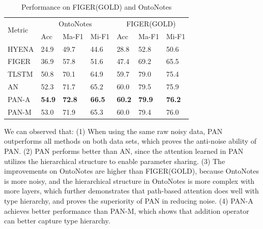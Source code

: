 \documentclass[letterpaper]{article} %
\begin{document}
\vspace{-17pt}
\begin{table}[htbp]
\small
\centering
\caption{Performance on FIGER(GOLD) and OntoNotes}
\label{performance}
 \begin{tabular}{p{1cm}|p{0.61cm}p{0.87cm}p{0.87cm}|p{0.60cm}p{0.87cm}p{0.87cm}}
\hline
\multirow{2}{*}{Metric} & \multicolumn{3}{c|}{OntoNotes} & \multicolumn{3}{c}{FIGER(GOLD)} \\
  & Acc &  Ma-F1 & Mi-F1 & Acc & Ma-F1 & Mi-F1 \\
\hline
HYENA & 24.9 & 49.7 & 44.6 & 28.8 & 52.8 & 50.6 \\
FIGER & 36.9 & 57.8 & 51.6 &  47.4 & 69.2 & 65.5  \\
TLSTM & 50.8 & 70.1 & 64.9 &  59.7 & 79.0 & 75.4  \\
\hline
AN & 52.3 & 71.7 & 65.2 & 60.0 & 79.5 & 75.9  \\
PAN-A & \textbf{54.9} & \textbf{72.8} & \textbf{66.5} & \textbf{60.2} & \textbf{79.9} & \textbf{76.2}  \\
PAN-M &  53.0 & 71.9 &65.3 & 60.0 & 79.4 &  76.0 \\
\hline
\end{tabular}
\vspace{-10pt}
\end{table}

We can observed that: (1) When using the same raw noisy data, PAN outperforms all methods on both data sets, %
which proves the anti-noise ability of PAN. 
(2) PAN performs better than AN, since the attention learned in PAN utilizes the hierarchical structure to enable parameter sharing. %
(3) The improvements on OntoNotes are higher than FIGER(GOLD), %
because OntoNotes is more noisy, and the hierarchical structure in OntoNotes is more complex with more layers, which further demonstrates that path-based attention does well with type hierarchy, and proves the superiority of PAN in reducing noise. 
(4) PAN-A achieves better performance than PAN-M, which shows that addition operator can better capture type hierarchy. 
\end{document}
